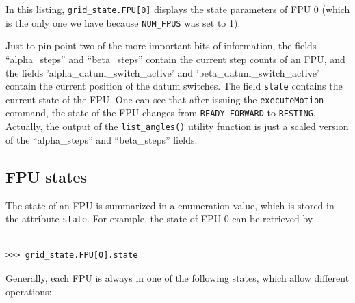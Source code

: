 \documentclass{scrartcl}[12pt,a4paper]
\begin{document}
In this listing, \verb+grid_state.FPU[0]+ displays the state parameters of
FPU 0 (which is the only one we have because \texttt{NUM\_FPUS} was
set to 1).

Just to pin-point two of the more important bits of information, the
fields ``alpha\_steps'' and ``beta\_steps'' contain the current step
counts of an FPU, and the fields 'alpha\_datum\_switch\_active' and
'beta\_datum\_switch\_active' contain the current position of the
datum switches. The field \texttt{state} contains the current state of
the FPU. One can see that after issuing the \texttt{executeMotion}
command, the state of the FPU changes from \texttt{READY\_FORWARD} to
\texttt{RESTING}. Actually, the output of the \texttt{list\_angles()}
utility function is just a scaled version of the ``alpha\_steps'' and
``beta\_steps'' fields.

\subsection{FPU states}
The state of an FPU is summarized in a enumeration value, which is
stored in the attribute \texttt{state}. For example, the state of FPU 0
can be retrieved by

\begin{verbatim}

>>> grid_state.FPU[0].state
\end{verbatim}

Generally, each FPU is always in one of the following states,
which allow different operations:
\end{document}
